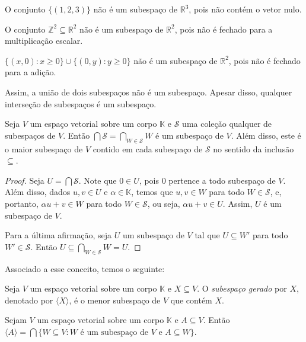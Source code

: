 \begin{example}
    O conjunto $\{(1, 2, 3)\}$ não é um subespaço de $\mathbb R^3$, pois não contém o vetor nulo.
\end{example}
\begin{example}
    O conjunto $\mathbb Z^2\subseteq \mathbb R^2$ não é um subespaço de $\mathbb R^2$, pois não é fechado para a multiplicação escalar.
\end{example}
\begin{example}
    $\{(x, 0): x \geq 0\}\cup\{(0, y): y \geq 0\}$ não é um subespaço de $\mathbb R^2$, pois não é fechado para a adição.
\end{example}
Assim, a união de dois subespaços não é um subespaço.
Apesar disso, qualquer interseção de subespaços é um subespaço.
\begin{proposition}
    Seja $V$ um espaço vetorial sobre um corpo $\mathbb K$ e $\mathcal S$ uma coleção qualquer de subespaços de $V$.
    Então $\bigcap \mathcal S=\bigcap_{W \in \mathcal S} W$ é um subespaço de $V$.
    Além disso, este é o maior subespaço de $V$ contido em cada subespaço de $\mathcal S$ no sentido da inclusão $\subseteq$.
\end{proposition}
\begin{proof}
    Seja $U=\bigcap \mathcal S$.
    Note que $0 \in U$, pois $0$ pertence a todo subespaço de $V$.
    Além disso, dados $u, v \in U$ e $\alpha \in \mathbb K$, temos que $u, v \in W$ para todo $W \in \mathcal S$, e, portanto, $\alpha u + v \in W$ para todo $W \in \mathcal S$, ou seja, $\alpha u + v \in U$.
    Assim, $U$ é um subespaço de $V$.

    Para a última afirmação, seja $U$ um subespaço de $V$ tal que $U \subseteq W'$ para todo $W' \in \mathcal S$.
    Então $U \subseteq \bigcap_{W \in \mathcal S} W = U$.
\end{proof}

Associado a esse conceito, temos o seguinte:
\begin{definition}
    Seja $V$ um espaço vetorial sobre um corpo $\mathbb K$ e $X \subseteq V$.
    O \emph{subespaço gerado} por $X$, denotado por $\langle X \rangle$, é o menor subespaço de $V$ que contém $X$.
\end{definition}
\begin{lemma}
    Sejam $V$ um espaço vetorial sobre um corpo $\mathbb K$ e $A \subseteq V$.
    Então $\langle A \rangle = \bigcap \{W \subseteq V : W \text{ é um subespaço de } V \text{ e } A \subseteq W\}$.
\end{lemma}